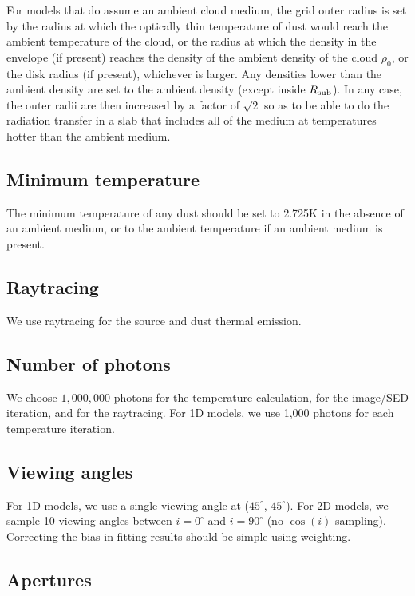 \documentclass[10pt]{article}
\begin{document}
For models that do assume an ambient cloud medium, the grid outer radius is set by the radius at which the optically thin temperature of dust would reach the ambient temperature of the cloud, or the radius at which the density in the envelope (if present) reaches the density of the ambient density of the cloud $\rho_0$, or the disk radius (if present), whichever is larger. Any densities lower than the ambient density are set to the ambient density (except inside $R_{\rm sub}$). In any case, the outer radii are then increased by a factor of $\sqrt{2}$ so as to be able to do the radiation transfer in a slab that includes all of the medium at temperatures hotter than the ambient medium.

\subsection{Minimum temperature}

The minimum temperature of any dust should be set to 2.725K in the absence of an ambient medium, or to the ambient temperature if an ambient medium is present.

\subsection{Raytracing}

We use raytracing for the source and dust thermal emission.

\subsection{Number of photons}

We choose $1,000,000$ photons for the temperature calculation, for the image/SED iteration, and for the raytracing. For 1D models, we use 1,000 photons for each temperature iteration.

\subsection{Viewing angles}

For 1D models, we use a single viewing angle at ($45^\circ$, $45^\circ$). For 2D models, we sample 10 viewing angles between $i=0^\circ$ and $i=90^\circ$ (no $\cos(i)$ sampling). Correcting the bias in fitting results should be simple using weighting.

\subsection{Apertures}
\end{document}
